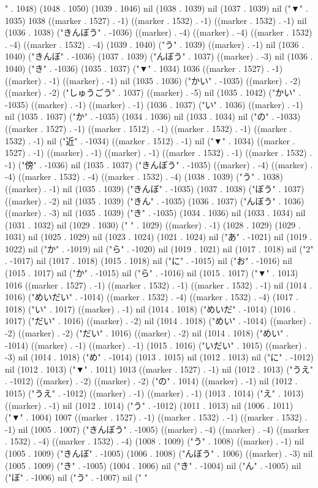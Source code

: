 " . 1048) (1048 . 1050) (1039 . 1046) nil (1038 . 1039) nil (1037 . 1039) nil ("▼" . 1035) 1038 ((marker . 1527) . -1) ((marker . 1532) . -1) ((marker . 1532) . -1) nil (1036 . 1038) ("きんぼう" . -1036) ((marker) . -4) ((marker) . -4) ((marker . 1532) . -4) ((marker . 1532) . -4) (1039 . 1040) ("う" . 1039) ((marker) . -1) nil (1036 . 1040) ("きんぼ" . -1036) (1037 . 1039) ("んぼう" . 1037) ((marker) . -3) nil (1036 . 1040) ("き" . -1036) (1035 . 1037) ("▼" . 1034) 1036 ((marker . 1527) . -1) ((marker) . -1) ((marker) . -1) nil (1035 . 1036) ("かい" . -1035) ((marker) . -2) ((marker) . -2) ("しゅうごう" . 1037) ((marker) . -5) nil (1035 . 1042) ("かい" . -1035) ((marker) . -1) ((marker) . -1) (1036 . 1037) ("い" . 1036) ((marker) . -1) nil (1035 . 1037) ("か" . -1035) (1034 . 1036) nil (1033 . 1034) nil ("の" . -1033) ((marker . 1527) . -1) ((marker . 1512) . -1) ((marker . 1532) . -1) ((marker . 1532) . -1) nil ("近" . -1034) ((marker . 1512) . -1) nil ("▼" . 1034) ((marker . 1527) . -1) ((marker) . -1) ((marker) . -1) ((marker . 1532) . -1) ((marker . 1532) . -1) ("傍" . -1036) nil (1035 . 1037) ("きんぼう" . -1035) ((marker) . -4) ((marker) . -4) ((marker . 1532) . -4) ((marker . 1532) . -4) (1038 . 1039) ("う" . 1038) ((marker) . -1) nil (1035 . 1039) ("きんぼ" . -1035) (1037 . 1038) ("ぼう" . 1037) ((marker) . -2) nil (1035 . 1039) ("きん" . -1035) (1036 . 1037) ("んぼう" . 1036) ((marker) . -3) nil (1035 . 1039) ("き" . -1035) (1034 . 1036) nil (1033 . 1034) nil (1031 . 1032) nil (1029 . 1030) (" " . 1029) ((marker) . -1) (1028 . 1029) (1029 . 1031) nil (1025 . 1029) nil (1023 . 1024) (1021 . 1024) nil ("あ" . -1021) nil (1019 . 1022) nil ("か" . -1019) nil ("ら" . -1020) nil (1019 . 1021) nil (1017 . 1018) nil ("2" . -1017) nil (1017 . 1018) (1015 . 1018) nil ("に" . -1015) nil ("お" . -1016) nil (1015 . 1017) nil ("か" . -1015) nil ("ら" . -1016) nil (1015 . 1017) ("▼" . 1013) 1016 ((marker . 1527) . -1) ((marker . 1532) . -1) ((marker . 1532) . -1) nil (1014 . 1016) ("めいだい" . -1014) ((marker . 1532) . -4) ((marker . 1532) . -4) (1017 . 1018) ("い" . 1017) ((marker) . -1) nil (1014 . 1018) ("めいだ" . -1014) (1016 . 1017) ("だい" . 1016) ((marker) . -2) nil (1014 . 1018) ("めい" . -1014) ((marker) . -2) ((marker) . -2) ("だい" . 1016) ((marker) . -2) nil (1014 . 1018) ("めい" . -1014) ((marker) . -1) ((marker) . -1) (1015 . 1016) ("いだい" . 1015) ((marker) . -3) nil (1014 . 1018) ("め" . -1014) (1013 . 1015) nil (1012 . 1013) nil ("に" . -1012) nil (1012 . 1013) ("▼" . 1011) 1013 ((marker . 1527) . -1) nil (1012 . 1013) ("うえ" . -1012) ((marker) . -2) ((marker) . -2) ("の" . 1014) ((marker) . -1) nil (1012 . 1015) ("うえ" . -1012) ((marker) . -1) ((marker) . -1) (1013 . 1014) ("え" . 1013) ((marker) . -1) nil (1012 . 1014) ("う" . -1012) (1011 . 1013) nil (1006 . 1011) ("▼" . 1004) 1007 ((marker . 1527) . -1) ((marker . 1532) . -1) ((marker . 1532) . -1) nil (1005 . 1007) ("きんぼう" . -1005) ((marker) . -4) ((marker) . -4) ((marker . 1532) . -4) ((marker . 1532) . -4) (1008 . 1009) ("う" . 1008) ((marker) . -1) nil (1005 . 1009) ("きんぼ" . -1005) (1006 . 1008) ("んぼう" . 1006) ((marker) . -3) nil (1005 . 1009) ("き" . -1005) (1004 . 1006) nil ("き" . -1004) nil ("ん" . -1005) nil ("ぼ" . -1006) nil ("う" . -1007) nil (" " 